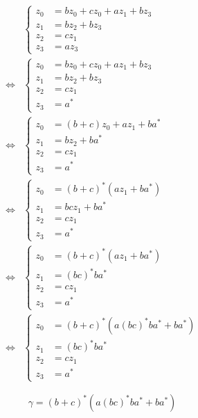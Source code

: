 \documentclass[10pt,a4paper]{article}
\begin{document}
\begin{align*}
  &
  \begin{cases}
    z_{0} & = bz_{0} + cz_{0} + az_{1} + bz_{3}\\
    z_{1} & = bz_{2} + bz_{3}\\
    z_{2} & = cz_{1}\\
    z_{3} & = az_{3}
  \end{cases}
  \\\Leftrightarrow &
  \begin{cases}
    z_{0} & = bz_{0} + cz_{0} + az_{1} + bz_{3}\\
    z_{1} & = bz_{2} + bz_{3}\\
    z_{2} & = cz_{1}\\
    z_{3} & = a^{*}
  \end{cases}
  \\\Leftrightarrow &
  \begin{cases}
    z_{0} & = (b + c)z_{0} + az_{1} + ba^{*}\\
    z_{1} & = bz_{2} + ba^{*}\\
    z_{2} & = cz_{1}\\
    z_{3} & = a^{*}
  \end{cases}
  \\\Leftrightarrow &
  \begin{cases}
    z_{0} & = (b + c)^{*}(az_{1} + ba^{*})\\
    z_{1} & = bcz_{1} + ba^{*}\\
    z_{2} & = cz_{1}\\
    z_{3} & = a^{*}
  \end{cases}
  \\\Leftrightarrow &
  \begin{cases}
    z_{0} & = (b + c)^{*}(az_{1} + ba^{*})\\
    z_{1} & = (bc)^{*}ba^{*}\\
    z_{2} & = cz_{1}\\
    z_{3} & = a^{*}
  \end{cases}
  \\\Leftrightarrow &
  \begin{cases}
    z_{0} & = (b + c)^{*}(a(bc)^{*}ba^{*} + ba^{*})\\
    z_{1} & = (bc)^{*}ba^{*}\\
    z_{2} & = cz_{1}\\
    z_{3} & = a^{*}
  \end{cases}
\end{align*}

\begin{equation}
  \gamma = (b + c)^{*}(a(bc)^{*}ba^{*} + ba^{*})
\end{equation}
\end{document}
